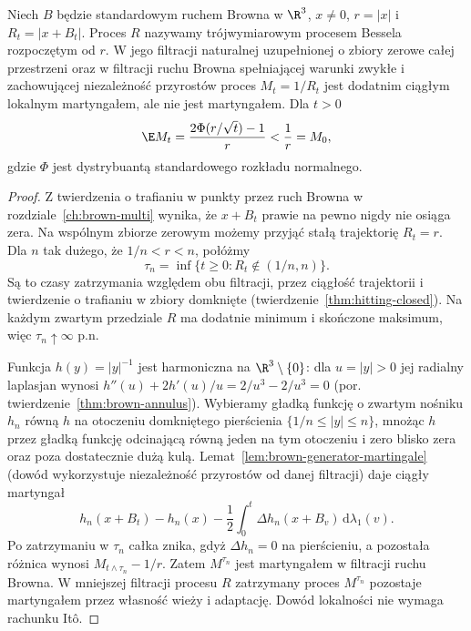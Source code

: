 \begin{twierdzenie}
\label{thm:inverse-bessel-strict-local}
Niech $B$ będzie standardowym ruchem Browna
w $\R^3$, $x\ne0$, $r=|x|$ i
$R_t=|x+B_t|$. Proces $R$ nazywamy
trójwymiarowym procesem Bessela rozpoczętym od $r$.
W jego filtracji naturalnej uzupełnionej
o zbiory zerowe całej przestrzeni
oraz w filtracji ruchu Browna spełniającej
warunki zwykłe i zachowującej niezależność
przyrostów proces $M_t=1/R_t$ jest dodatnim
ciągłym lokalnym martyngałem, ale nie jest
martyngałem. Dla $t>0$
\[
\E M_t=\frac{2\Phi(r/\sqrt t)-1}{r}
<\frac1r=M_0,
\]
gdzie $\Phi$ jest dystrybuantą standardowego
rozkładu normalnego.
\end{twierdzenie}
\begin{proof}
Z twierdzenia o trafianiu w punkty przez ruch
Browna w rozdziale~\ref{ch:brown-multi}
wynika, że $x+B_t$ prawie na pewno nigdy nie
osiąga zera. Na wspólnym zbiorze zerowym
możemy przyjąć stałą trajektorię $R_t=r$.
Dla $n$ tak dużego, że $1/n<r<n$, połóżmy
\[
\tau_n=\inf\{t\ge0:R_t\notin(1/n,n)\}.
\]
Są to czasy zatrzymania względem obu filtracji,
przez ciągłość trajektorii i twierdzenie
o trafianiu w zbiory domknięte
(twierdzenie~\ref{thm:hitting-closed}).
Na każdym zwartym przedziale $R$ ma dodatnie
minimum i skończone maksimum, więc
$\tau_n\uparrow\infty$ p.n.

Funkcja $h(y)=|y|^{-1}$ jest harmoniczna
na $\R^3\setminus\{0\}$: dla $u=|y|>0$
jej radialny laplasjan wynosi
$h''(u)+2h'(u)/u=2/u^3-2/u^3=0$
(por. twierdzenie~\ref{thm:brown-annulus}).
Wybieramy gładką funkcję o zwartym nośniku
$h_n$ równą $h$ na otoczeniu domkniętego
pierścienia $\{1/n\le |y|\le n\}$,
mnożąc $h$ przez gładką funkcję odcinającą
równą jeden na tym otoczeniu i zero blisko
zera oraz poza dostatecznie dużą kulą.
Lemat~\ref{lem:brown-generator-martingale}
(dowód wykorzystuje niezależność przyrostów
od danej filtracji) daje ciągły martyngał
\[
h_n(x+B_t)-h_n(x)
-\frac12\int_0^t\Delta h_n(x+B_v)\,\mathrm d\lambda_1(v).
\]
Po zatrzymaniu w $\tau_n$ całka znika,
gdyż $\Delta h_n=0$ na pierścieniu,
a pozostała różnica wynosi
$M_{t\wedge\tau_n}-1/r$.
Zatem $M^{\tau_n}$ jest martyngałem
w filtracji ruchu Browna. W mniejszej filtracji procesu $R$
zatrzymany proces $M^{\tau_n}$ pozostaje
martyngałem przez własność wieży i adaptację. Dowód lokalności nie wymaga
rachunku It\^o.


\end{proof}
